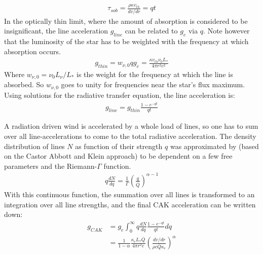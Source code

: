 \begin{align}
\tau_{sob} = \frac{\rho \kappa v_{th}}{dv/dr} = qt
\end{align}
In the optically thin limit, where the amount of absorption is considered to be insignificant, the line acceleration $g_{line}$ can be related to $g_e$ via $q$. Note however that the luminosity of the star has to be weighted with the frequency at which absorption occurs. 
\begin{align}
g_{thin} = w_{\nu,0} q g_e = \frac{\kappa v_{th} \nu_0 L_*}{4 \pi r^2 c^2}
\end{align}
Where $w_{\nu,0} = \nu_0 L_\nu / L_*$ is the weight for the frequency at which the line is absorbed. So $w_{\nu,0}$ goes to unity for frequencies near the star's flux maximum. Using solutions for the radiative transfer equation, the line acceleration is:
\begin{align}
g_{line} = g_{thin} \frac{1 - e^{-qt}}{qt} 
\end{align}

A radiation driven wind is accelerated by a whole load of lines, so one has to sum over all line-accelerations to come to the total radiative acceleration. The density distribution of lines $N$ as function of their strength $q$ was approximated by \citep{Gayley1995} (based on the Castor Abbott and Klein  approach) to be dependent on a few free parameters and the Riemann-$\Gamma$ function.
\begin{align} 
q \frac{dN}{dq} = \frac{1}{\Gamma} \left(\frac{q}{\bar{Q}} \right)^{\alpha - 1}
\end{align}
With this continuous function, the summation over all lines is transformed to an integration over all line strengths, and the final CAK acceleration can be written down:
\begin{align}
g_{CAK} &= g_e \int_0^\infty q \frac{dN}{dq} \frac{1 - e^{-qt}}{qt} dq \\
        &= \frac{1}{1-\alpha} \frac{\kappa_e L_* \bar{Q}}{4\pi r^2 c} \left( \frac{dv/dr}{\rho c \bar{Q} \kappa_e} \right)^\alpha \label{g_CAK}
\end{align}

